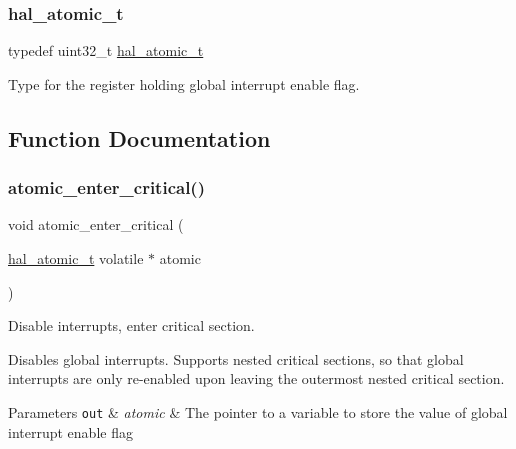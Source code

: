\subsubsection{\texorpdfstring{hal\+\_\+atomic\+\_\+t}{hal\_atomic\_t}}
{\footnotesize\ttfamily typedef uint32\+\_\+t \hyperlink{group__doc__driver__hal__helper__atomic_ga6b3a0c9eea25111ac1877e0302e2fe1c}{hal\+\_\+atomic\+\_\+t}}



Type for the register holding global interrupt enable flag. 



\subsection{Function Documentation}
\mbox{\label{group__doc__driver__hal__helper__atomic_ga3bd20e6e0bdec53177758490510ba916}} 
\subsubsection{\texorpdfstring{atomic\+\_\+enter\+\_\+critical()}{atomic\_enter\_critical()}}
{\footnotesize\ttfamily void atomic\+\_\+enter\+\_\+critical (\begin{DoxyParamCaption}\item[{\hyperlink{group__doc__driver__hal__helper__atomic_ga6b3a0c9eea25111ac1877e0302e2fe1c}{hal\+\_\+atomic\+\_\+t} volatile $\ast$}]{atomic }\end{DoxyParamCaption})}



Disable interrupts, enter critical section. 

Disables global interrupts. Supports nested critical sections, so that global interrupts are only re-\/enabled upon leaving the outermost nested critical section.


\begin{DoxyParams}[1]{Parameters}
\mbox{\tt out}  & {\em atomic} & The pointer to a variable to store the value of global interrupt enable flag \\
\hline
\end{DoxyParams}
\mbox{\label{group__doc__driver__hal__helper__atomic_ga75fe13100e2799eb24a80123bc8c3787}} 

